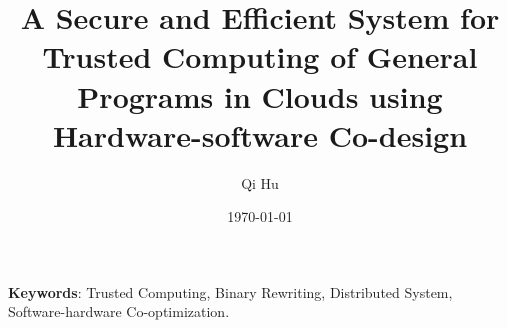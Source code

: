 \documentclass[a4paper,11pt]{article}
\title{A Secure and Efficient System for Trusted Computing of General Programs in Clouds using Hardware-software Co-design}
\author{Qi Hu}
\date{\today}
\newcommand\keywords[1]{\textbf{Keywords}: #1}
\begin{document}
  \maketitle%
  \keywords{Trusted Computing, Binary Rewriting, Distributed System, Software-hardware Co-optimization.}

  
  
  
  
  
  

  
  
\end{document}
